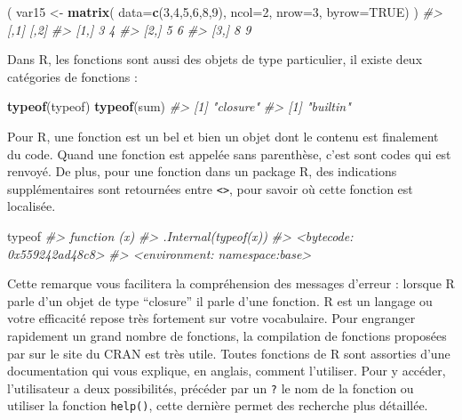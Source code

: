 \documentclass[]{article}
\newenvironment{Shaded}{\begin{snugshade}}{\end{snugshade}}
\newcommand{\CommentTok}[1]{\textcolor[rgb]{0.56,0.35,0.01}{\textit{#1}}}
\newcommand{\DataTypeTok}[1]{\textcolor[rgb]{0.13,0.29,0.53}{#1}}
\newcommand{\DecValTok}[1]{\textcolor[rgb]{0.00,0.00,0.81}{#1}}
\newcommand{\KeywordTok}[1]{\textcolor[rgb]{0.13,0.29,0.53}{\textbf{#1}}}
\newcommand{\NormalTok}[1]{#1}
\newcommand{\OtherTok}[1]{\textcolor[rgb]{0.56,0.35,0.01}{#1}}
\newcommand{\StringTok}[1]{\textcolor[rgb]{0.31,0.60,0.02}{#1}}
\begin{document}
\begin{Shaded}
\begin{Highlighting}[]
\NormalTok{(}
\NormalTok{  var15 <-}\StringTok{ }\KeywordTok{matrix}\NormalTok{(}
    \DataTypeTok{data=}\KeywordTok{c}\NormalTok{(}\DecValTok{3}\NormalTok{,}\DecValTok{4}\NormalTok{,}\DecValTok{5}\NormalTok{,}\DecValTok{6}\NormalTok{,}\DecValTok{8}\NormalTok{,}\DecValTok{9}\NormalTok{),}
    \DataTypeTok{ncol=}\DecValTok{2}\NormalTok{,}
    \DataTypeTok{nrow=}\DecValTok{3}\NormalTok{,}
    \DataTypeTok{byrow=}\OtherTok{TRUE}\NormalTok{)}
\NormalTok{)}
\CommentTok{#>      [,1] [,2]}
\CommentTok{#> [1,]    3    4}
\CommentTok{#> [2,]    5    6}
\CommentTok{#> [3,]    8    9}
\end{Highlighting}
\end{Shaded}

Dans R, les fonctions sont aussi des objets de type particulier, il existe deux catégories de fonctions :

\begin{Shaded}
\begin{Highlighting}[]
\KeywordTok{typeof}\NormalTok{(typeof)}
\KeywordTok{typeof}\NormalTok{(sum)}
\CommentTok{#> [1] "closure"}
\CommentTok{#> [1] "builtin"}
\end{Highlighting}
\end{Shaded}

Pour R, une fonction est un bel et bien un objet dont le contenu est finalement du code. Quand une fonction est appelée sans parenthèse, c'est sont codes qui est renvoyé. De plus, pour une fonction dans un package R, des indications supplémentaires sont retournées entre \texttt{<>}, pour savoir où cette fonction est localisée.

\begin{Shaded}
\begin{Highlighting}[]
\NormalTok{typeof}
\CommentTok{#> function (x) }
\CommentTok{#> .Internal(typeof(x))}
\CommentTok{#> <bytecode: 0x559242ad48c8>}
\CommentTok{#> <environment: namespace:base>}
\end{Highlighting}
\end{Shaded}

Cette remarque vous facilitera la compréhension des messages d'erreur : lorsque
R parle d'un objet de type ``closure'' il parle d'une fonction. R est un langage
ou votre efficacité repose très fortement sur votre vocabulaire. Pour engranger
rapidement un grand nombre de fonctions, la compilation de fonctions proposées
par sur le site du CRAN est très utile. Toutes fonctions de R sont assorties
d'une documentation qui vous explique, en anglais, comment l'utiliser. Pour y
accéder, l'utilisateur a deux possibilités, précéder par un \texttt{?} le nom de
la fonction ou utiliser la fonction \texttt{help()}, cette dernière permet des
recherche plus détaillée.
\end{document}
